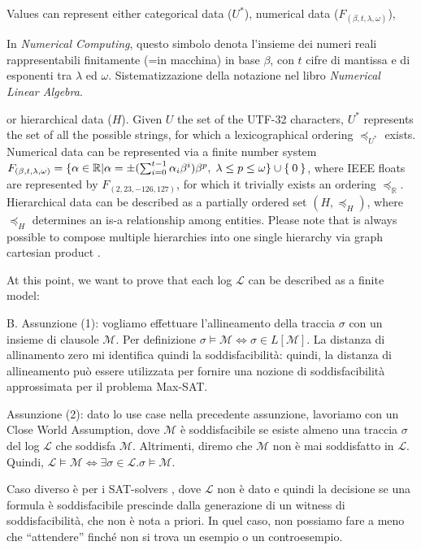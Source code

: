 Values can represent either categorical data ($U^*$), numerical data ($F_{(\beta,t,\lambda,\omega)}$), 
\begin{UnknownEnvironment}
	\color{red} In \textit{Numerical Computing}, questo simbolo denota   l'insieme dei numeri reali rappresentabili finitamente (=in macchina) in base $\beta$, con $t$ cifre di mantissa e di esponenti tra $\lambda$ ed $\omega$. Sistematizzazione della notazione nel libro \textit{Numerical Linear Algebra}. 
\end{UnknownEnvironment}
or hierarchical data ($H$). Given $U$ the set of the UTF-32 characters, $U^*$ represents the set of all the possible strings, for which  a lexicographical ordering $\preceq_{U^*}$  exists. Numerical data can be represented via a finite number system $F_{(\beta,t,\lambda,\omega)}=\{\alpha\in\mathbb{R}|\alpha=\pm (\sum_{i=0}^{t-1}\alpha_i\beta^i)\beta^p,\;\lambda\leq p\leq \omega\}\cup\Set{0}$, where IEEE floats are represented by $F_{(2,23,-126,127)}$, for which it trivially exists an ordering $\preceq_{\mathbb{R}}$. Hierarchical data can be described as a partially ordered set $(H,\preceq_H)$, where $\preceq_H$ determines an is-a relationship among entities. Please note that is always possible to compose multiple hierarchies into one single hierarchy via graph cartesian product \cite{BergamiBM20}. 

At this point, we want to prove that each log $\mathcal{L}$ can be described as a finite model: 
\begin{UnknownEnvironment}
	\color{red} B. Assunzione (1): vogliamo effettuare l'allineamento della traccia $\sigma$ con un insieme di clausole $\mathcal{M}$. Per definizione $\sigma\vDash\mathcal{M} \Leftrightarrow \sigma\in L[\mathcal{M}]$. La distanza di allinamento zero mi identifica quindi la soddisfacibilità: quindi, la distanza di allineamento può essere utilizzata per fornire una nozione di soddisfacibilità approssimata per il problema Max-SAT. 
	
	Assunzione (2): dato lo use case nella precedente assunzione, lavoriamo con un Close World Assumption, dove  $\mathcal{M}$ è soddisfacibile se esiste almeno una traccia $\sigma$ del log $\mathcal{L}$ che soddisfa $\mathcal{M}$. Altrimenti, diremo che $\mathcal{M}$ non è mai soddisfatto in $\mathcal{L}$. Quindi, $\mathcal{L}\vDash\mathcal{M}\Leftrightarrow\exists \sigma\in\mathcal{L}. \sigma\vDash\mathcal{M}$.
	
	Caso diverso è per i SAT-solvers \cite{LiPZVR20}, dove $\mathcal{L}$ non è dato e quindi la decisione se una formula è soddisfacibile prescinde dalla generazione di un witness di soddisfacibilità, che non è nota a priori. In quel caso, non possiamo fare a meno che ``attendere'' finché non si trova un esempio o un controesempio.
\end{UnknownEnvironment}

